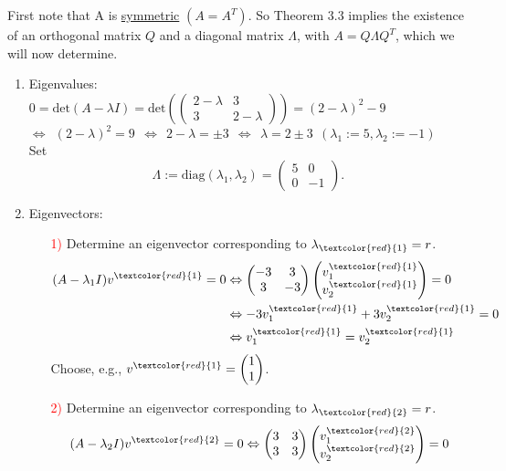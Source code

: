 {\color{solution}
First note that A is \underline{symmetric} $(A=A^T)$. So Theorem 3.3 implies the existence of an orthogonal matrix $Q$ and a diagonal matrix $\Lambda$, with $A=Q\Lambda Q^T$, which we will now determine.
\begin{enumerate}
	\item Eigenvalues:\\
	$0= \text{det}(A-\lambda I) = \text{det}\left(\begin{pmatrix}2-\lambda&3\\3&2-\lambda\end{pmatrix}\right) = (2-\lambda)^2-9$\\
	$\Leftrightarrow~~(2-\lambda)^2 = 9~~ \Leftrightarrow~~2-\lambda = \pm 3~~ \Leftrightarrow~~\lambda = 2\pm 3~~ (\lambda_1:=5, \lambda_2:=-1)$\\
	Set $$\Lambda:=\text{diag}(\lambda_1,\lambda_2)=\begin{pmatrix}5&0\\0&-1\end{pmatrix}.$$
	\item Eigenvectors:\\
	\begin{enumerate}
		\item[\textcolor{red}{1)}] 
		Determine an eigenvector corresponding to $\lambda_{\textcolor{red}{1}}=r$.
		\begin{align*}
		(A-\lambda_1 I)v^{\textcolor{red}{1}}=0 &\Leftrightarrow \begin{pmatrix}-3&3\\3&-3\end{pmatrix}\begin{pmatrix}v_1^{\textcolor{red}{1}}\\v_2^{\textcolor{red}{1}}\end{pmatrix}=0\\
		&\Leftrightarrow -3v_1^{\textcolor{red}{1}}+3v_2^{\textcolor{red}{1}} =0\\
		&\Leftrightarrow v_1^{\textcolor{red}{1}} = v_2^{\textcolor{red}{1}}
		\end{align*}
		Choose, e.g., $v^{\textcolor{red}{1}} = \begin{pmatrix}1\\1\end{pmatrix}$.
		\item[\textcolor{red}{2)}] 
		Determine an eigenvector corresponding to $\lambda_{\textcolor{red}{2}}=r$.
		\begin{align*}
		(A-\lambda_2 I)v^{\textcolor{red}{2}}=0 &\Leftrightarrow \begin{pmatrix}3&3\\3&3\end{pmatrix}\begin{pmatrix}v_1^{\textcolor{red}{2}}\\v_2^{\textcolor{red}{2}}\end{pmatrix}=0\\

\end{align*}
\end{enumerate}
\end{enumerate}}

